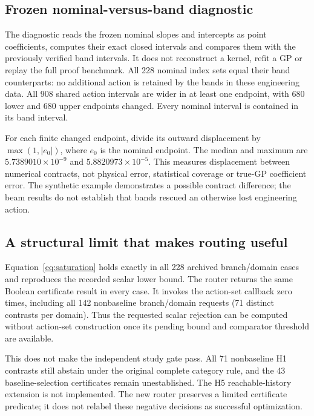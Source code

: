 \documentclass[]{interact}
\begin{document}
\subsection{Frozen nominal-versus-band diagnostic}\label{sec:nominal_diagnostic}

The diagnostic reads the frozen nominal slopes and intercepts as point coefficients, computes their exact closed intervals and compares them with the previously verified band intervals. It does not reconstruct a kernel, refit a GP or replay the full proof benchmark. All 228 nominal index sets equal their band counterparts: no additional action is retained by the bands in these engineering data. All 908 shared action intervals are wider in at least one endpoint, with 680 lower and 680 upper endpoints changed. Every nominal interval is contained in its band interval.

For each finite changed endpoint, divide its outward displacement by $\max(1,|e_0|)$, where $e_0$ is the nominal endpoint. The median and maximum are $5.7389010\times10^{-9}$ and $5.8820973\times10^{-5}$. This measures displacement between numerical contracts, not physical error, statistical coverage or true-GP coefficient error. The synthetic example demonstrates a possible contract difference; the beam results do not establish that bands rescued an otherwise lost engineering action.

\subsection{A structural limit that makes routing useful}

Equation~\eqref{eq:saturation} holds exactly in all 228 archived branch/domain cases and reproduces the recorded scalar lower bound. The router returns the same Boolean certificate result in every case. It invokes the action-set callback zero times, including all 142 nonbaseline branch/domain requests (71 distinct contrasts per domain). Thus the requested scalar rejection can be computed without action-set construction once its pending bound and comparator threshold are available.

This does not make the independent study gate pass. All 71 nonbaseline H1 contrasts still abstain under the original complete category rule, and the 43 baseline-selection certificates remain unestablished. The H5 reachable-history extension is not implemented. The new router preserves a limited certificate predicate; it does not relabel these negative decisions as successful optimization.
\end{document}
